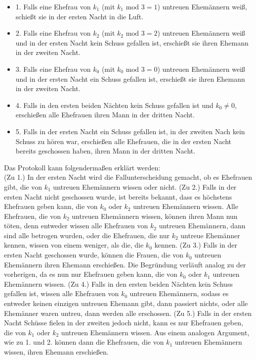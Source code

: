 \begin{itemize}
	\item 1. Falls eine Ehefrau von $k_1$ (mit $k_1 \text{ mod } 3 = 1$) untreuen Ehemännern weiß, schießt sie in der ersten Nacht in die Luft.
	\item 2. Falls eine Ehefrau von $k_2$ (mit $k_2 \text{ mod } 3 = 2$) untreuen Ehemännern weiß und in der ersten Nacht kein Schuss gefallen ist, erschießt sie ihren Ehemann in der zweiten Nacht.
	\item 3. Falls eine Ehefrau von $k_0$ (mit $k_0 \text{ mod } 3 = 0$) untreuen Ehemännern weiß und in der ersten Nacht ein Schuss gefallen ist, erschießt sie ihren Ehemann in der zweiten Nacht.
	\item 4. Falls in den ersten beiden Nächten kein Schuss gefallen ist und $k_0 \ne0$, erschießen alle Ehefrauen ihren Mann in der dritten Nacht.
	\item 5. Falls in der ersten Nacht ein Schuss gefallen ist, in der zweiten Nach kein Schuss zu hören war, erschießen alle Ehefrauen, die in der ersten Nacht bereits geschossen haben, ihren Mann in der dritten Nacht. 
\end{itemize}
Das Protokoll kann folgendermaßen erklärt werden:\\
(Zu 1.) In der ersten Nacht wird die Fallunterscheidung gemacht, ob es Ehefrauen gibt, die von $k_1$ untreuen Ehemännern wissen oder nicht.
(Zu 2.) Falls in der ersten Nacht nicht geschossen wurde, ist bereits bekannt, dass es höchstens Ehefrauen geben kann, die von $k_0$ oder $k_2$ untreuen Ehemännern wissen. Alle Ehefrauen, die von $k_2$ untreuen Ehemännern wissen, können ihren Mann nun töten, denn entweder wissen alle Ehefrauen von $k_2$ untreuen Ehemännern, dann sind alle betrogen wurden, oder die Ehefrauen, die nur $k_2$ untreue Ehemänner kennen, wissen von einem weniger, als die, die $k_0$ kennen.
(Zu 3.) Falls in der ersten Nacht geschossen wurde, können die Frauen, die von $k_0$ untreuen Ehemännern ihren Ehemann erschießen. Die Begründung verläuft analog zu der vorherigen, da es nun nur Ehefrauen geben kann, die von $k_0$ oder $k_1$ untreuen Ehemännern wissen.
(Zu 4.) Falls in den ersten beiden Nächten kein Schuss gefallen ist, wissen alle Ehefrauen von $k_0$ untreuen Ehemännern, sodass es entweder keinen einzigen untreuen Ehemann gibt, dann passiert nichts, oder alle Ehemänner waren untreu, dann werden alle erschossen.
(Zu 5.) Falls in der ersten Nacht Schüsse fielen in der zweiten jedoch nicht, kann es nur Ehefrauen geben, die von $k_1$ oder $k_2$ untreuen Ehemännern wissen. Aus einem analogen Argument, wie zu 1. und 2. können dann die Ehefrauen, die von $k_1$ untreuen Ehemännern wissen, ihren Ehemann erschießen.\medskip

